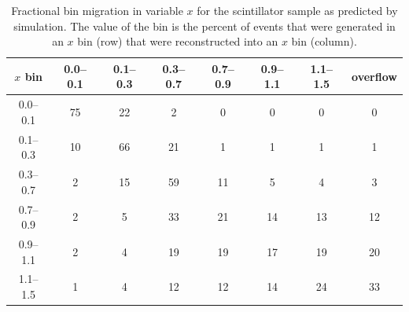 \documentclass[aps,preprint,showpacs,superscriptaddress]{revtex4} %
\newcommand{\Xbj}{\ensuremath{x}\xspace}
\begin{document}
\begingroup
\squeezetable
\begin{table}
\begin{tabular}{c|ccccccc}
\hline \hline
\Xbj bin & 0.0--0.1 & 0.1--0.3 & 0.3--0.7 & 0.7--0.9 & 0.9--1.1 & 1.1--1.5 & overflow \\ 
\hline
0.0--0.1 & 75 & 22 & 2 & 0 & 0 & 0 & 0 \\ 
0.1--0.3 & 10 & 66 & 21 & 1 & 1 & 1 & 1 \\ 
0.3--0.7 & 2 & 15 & 59 & 11 & 5 & 4 & 3 \\ 
0.7--0.9 & 2 & 5 & 33 & 21 & 14 & 13 & 12 \\ 
0.9--1.1 & 2 & 4 & 19 & 19 & 17 & 19 & 20 \\ 
1.1--1.5 & 1 & 4 & 12 & 12 & 14 & 24 & 33 \\ 
\hline \hline
\end{tabular}
\caption{Fractional bin migration in variable \Xbj for the scintillator sample as predicted by simulation.  The value of the bin is the percent of events that were generated in an \Xbj bin (row) that were reconstructed into an \Xbj bin (column).}
\label{tab:x_99_migration_table}
\end{table}
\endgroup
\begingroup
\squeezetable
\end{document}

